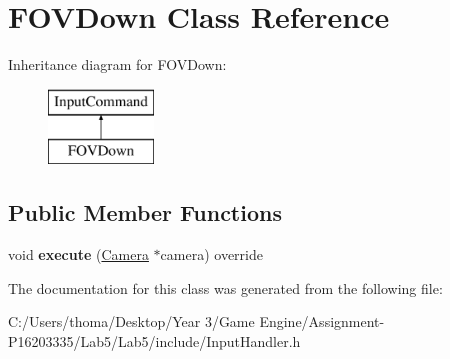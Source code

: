 \hypertarget{class_f_o_v_down}{}\section{F\+O\+V\+Down Class Reference}
\label{class_f_o_v_down}
Inheritance diagram for F\+O\+V\+Down\+:\begin{figure}[H]
\begin{center}
\leavevmode
\includegraphics[height=2.000000cm]{class_f_o_v_down}
\end{center}
\end{figure}
\subsection*{Public Member Functions}
\begin{DoxyCompactItemize}
\item 
\mbox{\label{class_f_o_v_down_a2bb50afa58475d7107a57f9942345b8b}} 
void {\bfseries execute} (\mbox{\hyperlink{class_camera}{Camera}} $\ast$camera) override
\end{DoxyCompactItemize}


The documentation for this class was generated from the following file\+:\begin{DoxyCompactItemize}
\item 
C\+:/\+Users/thoma/\+Desktop/\+Year 3/\+Game Engine/\+Assignment-\/\+P16203335/\+Lab5/\+Lab5/include/Input\+Handler.\+h\end{DoxyCompactItemize}
